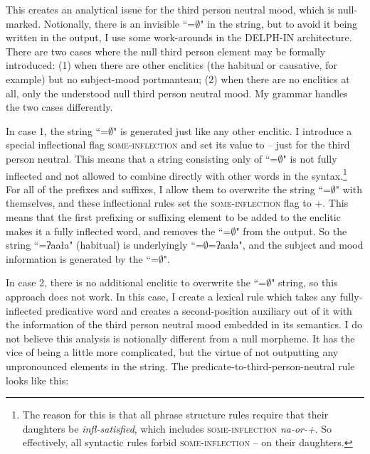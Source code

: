 This creates an analytical issue for the third person neutral mood, which is null-marked. Notionally, there is an invisible ``=$\emptyset$" in the string, but to avoid it being written in the output, I use some work-arounds in the DELPH-IN architecture. There are two cases where the null third person element may be formally introduced: (1) when there are other enclitics (the habitual or causative, for example) but no subject-mood portmanteau; (2) when there are no enclitics at all, only the understood null third person neutral mood. My grammar handles the two cases differently.

In case 1, the string ``=$\emptyset$" is generated just like any other enclitic. I introduce a special inflectional flag \citep{goodman2013} \textsc{some-inflection} and set its value to -- just for the third person neutral. This means that a string consisting only of ``=$\emptyset$" is not fully inflected and not allowed to combine directly with other words in the syntax.\footnote{The reason for this is that all phrase structure rules require that their daughters be \textit{infl-satisfied}, which includes \textsc{some-inflection} \textit{na-or-+}. So effectively, all syntactic rules forbid \textsc{some-inflection} -- on their daughters.} For all of the prefixes and suffixes, I allow them to overwrite the string ``=$\emptyset$" with themselves, and these inflectional rules set the \textsc{some-inflection} flag to +. This means that the first prefixing or suffixing element to be added to the enclitic makes it a fully inflected word, and removes the ``=$\emptyset$" from the output. So the string ``=ʔaała" (habitual) is underlyingly ``=$\emptyset$=ʔaała", and the subject and mood information is generated by the ``=$\emptyset$".

In case 2, there is no additional enclitic to overwrite the ``=$\emptyset$" string, so this approach does not work. In this case, I create a lexical rule which takes any fully-inflected predicative word and creates a second-position auxiliary out of it with the information of the third person neutral mood embedded in its semantics. I do not believe this analysis is notionally different from a null morpheme. It has the vice of being a little more complicated, but the virtue of not outputting any unpronounced elements in the string. The predicate-to-third-person-neutral rule looks like this:


